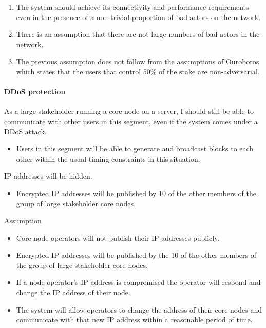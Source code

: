 \documentclass[11pt,a4paper]{article}
\begin{document}
\begin{enumerate}
\item
  The system should achieve its connectivity and performance
  requirements even in the presence of a non-trivial proportion of bad
  actors on the network.
\item
  There is an assumption that there are not large numbers of bad actors
  in the network.
\item
  The previous assumption does not follow from the assumptions of
  Ouroboros which states that the users that control 50\% of the stake
  are non-adversarial.
\end{enumerate}

\paragraph{DDoS protection}

As a large stakeholder running a core node on a server, I should still
be able to communicate with other users in this segment, even if the
system comes under a DDoS attack.

\begin{itemize}
\item
  Users in this segment will be able to generate and broadcast blocks to
  each other within the usual timing constraints in this situation.
\end{itemize}

IP addresses will be hidden.

\begin{itemize}
\item
  Encrypted IP addresses will be published by 10 of the other members of
  the group of large stakeholder core nodes.
\end{itemize}

Assumption

\begin{itemize}
\item
  Core node operators will not publish their IP addresses publicly.
\item
  Encrypted IP addresses will be published by the 10 of the other
  members of the group of large stakeholder core nodes.
\item
  If a node operator's IP address is compromised the operator will
  respond and change the IP address of their node.
\item
  The system will allow operators to change the address of their core
  nodes and communicate with that new IP address within a reasonable
  period of time.
\end{itemize}
\end{document}
